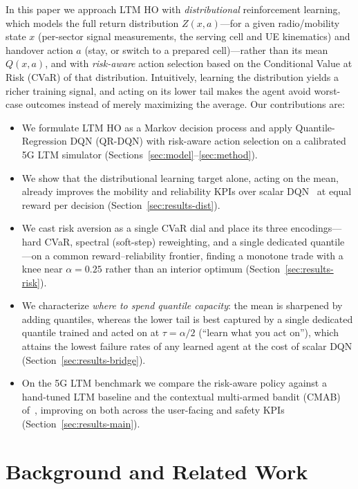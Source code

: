 \documentclass[conference]{IEEEtran}
\begin{document}
In this paper we approach LTM HO with \emph{distributional} reinforcement learning, which models the full return distribution $Z(x,a)$---for a given radio/mobility state $x$ (per-sector signal measurements, the serving cell and UE kinematics) and handover action $a$ (stay, or switch to a prepared cell)---rather than its mean $Q(x,a)$, and with \emph{risk-aware} action selection based on the Conditional Value at Risk (CVaR) of that distribution.
Intuitively, learning the distribution yields a richer training signal, and acting on its lower tail makes the agent avoid worst-case outcomes instead of merely maximizing the average.
Our contributions are:\begin{itemize}
  \item We formulate LTM HO as a Markov decision process and apply
  Quantile-Regression DQN (QR-DQN) with risk-aware action selection on a
  calibrated 5G LTM simulator (Sections~\ref{sec:model}--\ref{sec:method}).
  \item We show that the distributional learning target alone, acting on the mean,
  already improves the mobility and reliability KPIs over scalar DQN~\cite{dqn} at equal
  reward per decision (Section~\ref{sec:results-dist}).
  \item We cast risk aversion as a single CVaR dial and place its three
  encodings---hard CVaR, spectral (soft-step) reweighting, and a single dedicated
  quantile---on a common reward--reliability frontier, finding a monotone trade
  with a knee near $\alpha=0.25$ rather than an interior optimum
  (Section~\ref{sec:results-risk}).
  \item We characterize \emph{where to spend quantile capacity}: the mean is
  sharpened by adding quantiles, whereas the lower tail is best captured by a
  single dedicated quantile trained and acted on at $\tau=\alpha/2$ (``learn what
  you act on''), which attains the lowest failure rates of any learned agent at the
  cost of scalar DQN (Section~\ref{sec:results-bridge}).
  \item On the 5G LTM benchmark we compare the risk-aware policy against a
  hand-tuned LTM baseline and the contextual
  multi-armed bandit (CMAB) of~\cite{cmab_ho}, improving on both across the
  user-facing and safety KPIs (Section~\ref{sec:results-main}).
\end{itemize}


\section{Background and Related Work}
\label{sec:related}
\end{document}
